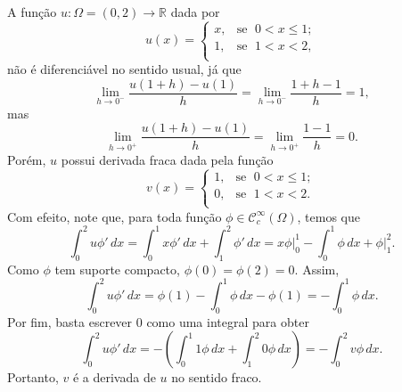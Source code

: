 \documentclass[a4paper, 11pt]{book}
\theoremstyle{definition}
\newcommand{\bR}{\mathbb{R}}
\newcommand{\cC}{\mathcal{C}}
\begin{document}
\begin{ex} \label{ex:derivada-fraca-R}
    A função $u : \Omega  =(0,2) \to \bR$ dada por
    \begin{equation} \label{eq:uxexemplo1}
        u(x) = \left\{
            \begin{array}{rl}
                x, & \!\text{se }\; 0 < x \leqslant 1;\\
                1, & \!\text{se }\; 1 < x < 2,\\
            \end{array}
        \right.
    \end{equation}
    não é diferenciável no sentido usual, já que
    \[
        \lim_{h\to 0^-} \frac{u(1 + h) - u(1)}{h} = \lim_{h \to 0^-} \frac{1 + h -1}{h} = 1,
    \]
    mas
    \[
        \lim_{h\to 0^+} \frac{u(1 + h) - u(1)}{h} = \lim_{h \to 0^+} \frac{1 -1}{h} = 0.
    \]
    Porém, $u$ possui derivada fraca dada pela função
    \[
        v(x) = \left\{
            \begin{array}{rl}
                1, & \text{se }\; 0 < x \leqslant 1;\\
                0, & \text{se }\; 1 < x < 2.\\
            \end{array}
        \right.
    \]
    Com efeito, note que, para toda função $\phi \in \cC^\infty_c(\Omega)$, temos que
    \[
        \int_0^2 u \phi' \,dx = \int_0^1 x \phi' \,dx + \int_1^2 \phi' \,dx = x \phi \bigg|_0^1 - \int_0^1 \phi \,dx + \phi \bigg|_1^2.
    \]
    Como $\phi$ tem suporte compacto, $\phi(0) = \phi(2) = 0$. Assim,
    \[
        \int_0^2 u \phi' \,dx = \phi(1) - \int_0^1 \phi \,dx - \phi(1) = -\int_0^1 \phi \,dx.
    \]
    Por fim, basta escrever $0$ como uma integral para obter
    \[
        \int_0^2 u \phi' \,dx = - \left(  \int_0^1 1\phi \, dx + \int_1^2 0\phi \,dx  \right) = -\int_0^2 v \phi \,dx.
    \]
    Portanto, $v$ é a derivada de $u$ no sentido fraco.
\end{ex}
\end{document}
